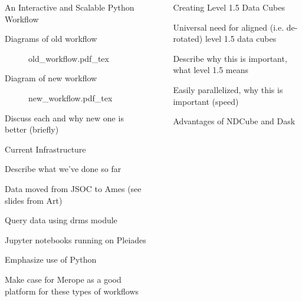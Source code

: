 \documentclass[final]{beamer}
\newlength{\sepwidth}
\newlength{\colwidth}
\newcommand{\separatorcolumn}{\begin{column}{\sepwidth}\end{column}}
\begin{document}
\begin{frame}[t]
\begin{columns}[t]
\begin{column}{\colwidth}
  \begin{block}{An Interactive and Scalable Python Workflow}

    Diagrams of old workflow

    \begin{figure}
      \centering
      \def\svgwidth{0.7\columnwidth}
      {old_workflow.pdf_tex}
    \end{figure}

    Diagram of new workflow

    \begin{figure}
      \centering
      \def\svgwidth{0.8\columnwidth}
      {new_workflow.pdf_tex}
    \end{figure}

    Discuss each and why new one is better (briefly)


  \end{block}

  \begin{block}{Current Infrastructure}

    Describe what we've done so far

    Data moved from JSOC to Ames (see slides from Art)

    Query data using drms module \citet{glogowski_drms_2019}

    Jupyter notebooks running on Pleiades

    Emphasize use of Python

    Make case for Merope as a good platform for these types of workflows

  \end{block}

\end{column}

\separatorcolumn

\begin{column}{\colwidth}

  \begin{block}{Creating Level 1.5 Data Cubes}

    Universal need for aligned (i.e. de-rotated) level 1.5 data cubes

    Describe why this is important, what level 1.5 means

    Easily parallelized, why this is important (speed)

    Advantages of NDCube and Dask


\end{block}
\end{column}
\end{columns}
\end{frame}
\end{document}
